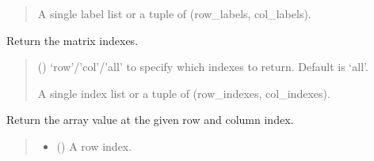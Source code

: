 \documentclass[letterpaper,12pt,english]{sphinxmanual}
\begin{document}
\begin{fulllineitems}
\begin{fulllineitems}
\begin{quote}
\begin{description}
\sphinxAtStartPar
{} \textendash{} A single label list or a tuple of (row\_labels, col\_labels).

\end{description}\end{quote}

\end{fulllineitems}


\begin{fulllineitems}
\label{\detokenize{api/core:cbmpy.CBCommon.StructMatrix.getIndexes}}
\pysigstartsignatures
\pysiglinewithargsret
{}
{}
{}
\pysigstopsignatures
\sphinxAtStartPar
Return the matrix indexes.
\begin{quote}\begin{description}
\sphinxAtStartPar
{} (\sphinxstyleliteralemphasis{\sphinxupquote{, }}) \textendash{} ‘row’/’col’/’all’ to specify which indexes to return. Default is ‘all’.

\sphinxAtStartPar
{} \textendash{} A single index list or a tuple of (row\_indexes, col\_indexes).

\end{description}\end{quote}

\end{fulllineitems}


\begin{fulllineitems}
\label{\detokenize{api/core:cbmpy.CBCommon.StructMatrix.getByIdx}}
\pysigstartsignatures
\pysiglinewithargsret
{}
{\sphinxparamcomma {}}
{}
\pysigstopsignatures
\sphinxAtStartPar
Return the array value at the given row and column index.
\begin{quote}\begin{description}
\begin{itemize}
\item {} 
\sphinxAtStartPar
{} () \textendash{} A row index.


\end{itemize}
\end{description}
\end{quote}
\end{fulllineitems}
\end{fulllineitems}
\end{document}
